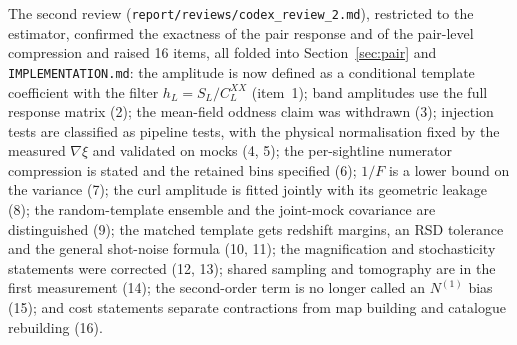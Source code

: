 \documentclass[11pt,a4paper]{article}
\begin{document}
The second review (\texttt{report/reviews/codex\_review\_2.md}), restricted to the estimator, confirmed the exactness of the pair response and of the pair-level compression and raised 16 items, all folded into Section~\ref{sec:pair} and \texttt{IMPLEMENTATION.md}: the amplitude is now defined as a conditional template coefficient with the filter $h_L=S_L/C^{XX}_L$ (item~1); band amplitudes use the full response matrix (2); the mean-field oddness claim was withdrawn (3); injection tests are classified as pipeline tests, with the physical normalisation fixed by the measured $\nabla\xi$ and validated on mocks (4, 5); the per-sightline numerator compression is stated and the retained bins specified (6); $1/F$ is a lower bound on the variance (7); the curl amplitude is fitted jointly with its geometric leakage (8); the random-template ensemble and the joint-mock covariance are distinguished (9); the matched template gets redshift margins, an RSD tolerance and the general shot-noise formula (10, 11); the magnification and stochasticity statements were corrected (12, 13); shared sampling and tomography are in the first measurement (14); the second-order term is no longer called an $N^{(1)}$ bias (15); and cost statements separate contractions from map building and catalogue rebuilding (16).



\end{document}
